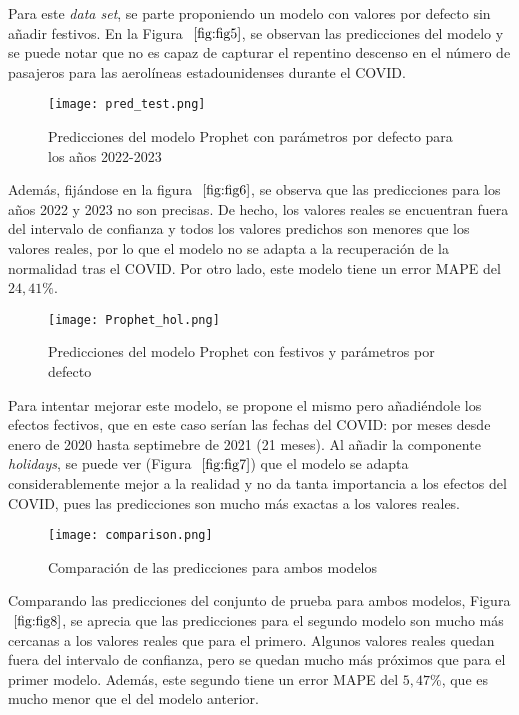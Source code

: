 \documentclass[12pt,twoside]{article}
\begin{document}
Para este \textit{data set}, se parte proponiendo un modelo con valores por defecto sin añadir festivos. En la Figura $~\ref{fig:fig5}$, se observan las predicciones del modelo y se puede notar que no es capaz de capturar el repentino descenso en el número de pasajeros para las aerolíneas estadounidenses durante el COVID.

\begin{figure}[h]
    \centering
    \texttt{[image: pred\_test.png]}
    \caption{Predicciones del modelo Prophet con parámetros por defecto para los años 2022-2023} 
    \label{fig:fig6}
\end{figure}

Además, fijándose en la figura $~\ref{fig:fig6}$, se observa que las predicciones para los años 2022 y 2023 no son precisas. De hecho, los valores reales se encuentran fuera del intervalo de confianza y todos los valores predichos son menores que los valores reales, por lo que el modelo no se adapta a la recuperación de la normalidad tras el COVID. Por otro lado, este modelo tiene un error MAPE del $24,41\%$.

\begin{figure}[h]
    \centering
    \texttt{[image: Prophet\_hol.png]}
    \caption{Predicciones del modelo Prophet con festivos y parámetros por defecto} 
    \label{fig:fig7}
\end{figure}

Para intentar mejorar este modelo, se propone el mismo pero añadiéndole los efectos fectivos, que en este caso serían las fechas del COVID: por meses desde enero de 2020 hasta septimebre de 2021 (21 meses). Al añadir la componente \textit{holidays}, se puede ver (Figura $~\ref{fig:fig7}$) que el modelo se adapta considerablemente mejor a la realidad y no da tanta importancia a los efectos del COVID, pues las predicciones son mucho más exactas a los valores reales.

\begin{figure}[h]
    \centering
    \texttt{[image: comparison.png]}
    \caption{Comparación de las predicciones para ambos modelos} 
    \label{fig:fig8}
\end{figure}

Comparando las predicciones del conjunto de prueba para ambos modelos, Figura $~\ref{fig:fig8}$, se aprecia que las predicciones para el segundo modelo son mucho más cercanas a los valores reales que para el primero. Algunos valores reales quedan fuera del intervalo de confianza, pero se quedan mucho más próximos que para el primer modelo. Además, este segundo tiene un error MAPE del $5,47\%$, que es mucho menor que el del modelo anterior.
\end{document}
